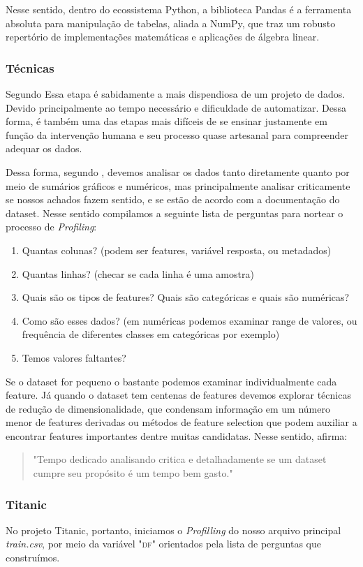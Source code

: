 \documentclass{article}
\begin{document}
Nesse sentido, dentro do ecossistema Python, a biblioteca Pandas é a ferramenta absoluta para manipulação de tabelas, aliada a NumPy, que traz um robusto repertório de implementações matemáticas e aplicações de álgebra linear.\cite{PRINCIPLES}

\subsubsection{Técnicas}
Segundo \cite{BATON,DONOHO,DATAPYTHON} Essa etapa é sabidamente a mais dispendiosa de um projeto de dados. Devido principalmente ao tempo necessário e dificuldade de automatizar. Dessa forma, é também uma das etapas mais difíceis de se ensinar justamente em função da intervenção humana e seu processo quase artesanal para compreender adequar os dados. 

Dessa forma, segundo \cite{DATAPYTHON}, devemos analisar os dados tanto diretamente quanto por meio de sumários gráficos e numéricos, mas principalmente analisar criticamente se nossos achados fazem sentido, e se estão de acordo com a documentação do dataset. Nesse sentido compilamos a seguinte lista de perguntas para nortear o processo de \emph{Profiling}:
\begin{enumerate}
\item Quantas colunas? (podem ser features, variável resposta, ou metadados)
\item Quantas linhas? (checar se cada linha é uma amostra)
\item Quais são os tipos de features? Quais são categóricas e quais são numéricas? 
\item Como são esses dados? (em numéricas podemos examinar range de valores, ou frequência de diferentes classes em categóricas por exemplo)
\item Temos valores faltantes? 
\end{enumerate}
Se o dataset for pequeno o bastante podemos examinar individualmente cada feature. Já quando o dataset tem centenas de features devemos explorar técnicas de redução de dimensionalidade, que condensam informação em um número menor de features derivadas ou métodos de feature selection que podem auxiliar a encontrar features importantes dentre muitas candidatas. Nesse sentido, \cite{DATAPYTHON} afirma:
\begin{quote}
    "Tempo dedicado analisando critica e detalhadamente se um dataset cumpre seu propósito é um tempo bem gasto." 
\end{quote}

\subsubsection{Titanic}
No projeto Titanic, portanto, iniciamos o \emph{Profilling} do nosso arquivo principal \emph{train.csv}, por meio da variável "\textsc{df}" orientados pela lista de perguntas que construímos.
\end{document}
